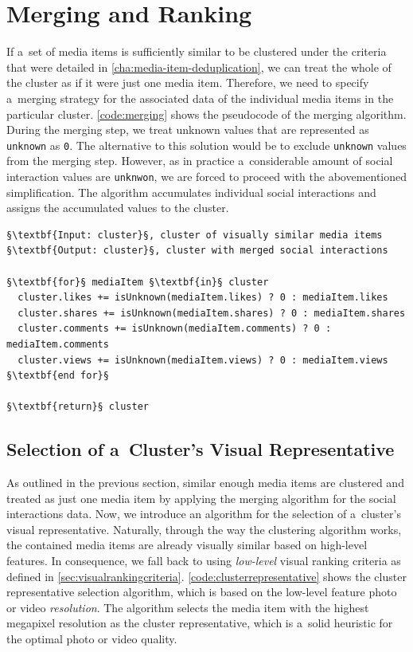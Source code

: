 \section{Merging and Ranking}
\label{sec:merging-social-interactions}

If a~set of media items is sufficiently similar to be clustered
under the criteria that were detailed in
\autoref{cha:media-item-deduplication},
we can treat the whole of the cluster
as if it were just one media item.
Therefore, we need to specify a~merging strategy
for the associated data of the individual media items
in the particular cluster.
\autoref{code:merging} shows the pseudocode of the merging algorithm.
During the merging step, we treat unknown values
that are represented as \texttt{unknown} as \texttt{0}.
The alternative to this solution would be to exclude \texttt{unknown} values
from the merging step.
However, as in practice a~considerable amount of
social interaction values are \texttt{unknwon},
we are forced to proceed with the abovementioned simplification.
The algorithm accumulates individual social interactions
and assigns the accumulated values to the cluster.

\begin{lstlisting}[caption=Social interactions merging algorithm,
  label=code:merging, float=!ht, escapechar=§]
§\textbf{Input: cluster}§, cluster of visually similar media items
§\textbf{Output: cluster}§, cluster with merged social interactions

§\textbf{for}§ mediaItem §\textbf{in}§ cluster
  cluster.likes += isUnknown(mediaItem.likes) ? 0 : mediaItem.likes
  cluster.shares += isUnknown(mediaItem.shares) ? 0 : mediaItem.shares
  cluster.comments += isUnknown(mediaItem.comments) ? 0 : mediaItem.comments
  cluster.views += isUnknown(mediaItem.views) ? 0 : mediaItem.views
§\textbf{end for}§

§\textbf{return}§ cluster
\end{lstlisting}

\subsection{Selection of a~Cluster's Visual Representative}

As outlined in the previous section, similar enough media items
are clustered and treated as just one media item
by applying the merging algorithm for the social interactions data.
Now, we introduce an algorithm for the selection of
a~cluster's visual representative.
Naturally, through the way the clustering algorithm works,
the contained media items are already visually similar
based on high-level features.
In consequence, we fall back to using \emph{low-level}
visual ranking criteria as defined in \autoref{sec:visualrankingcriteria}.
\autoref{code:clusterrepresentative} shows the cluster representative
selection algorithm, which is based on the low-level feature photo or video \emph{resolution}.
The algorithm selects the media item with the highest megapixel resolution
as the cluster representative,
which is a~solid heuristic for the optimal photo or video quality.

